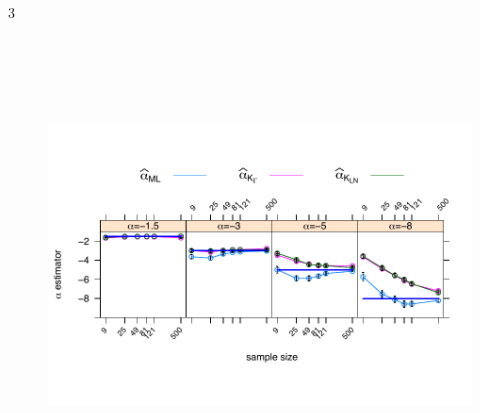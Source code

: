 \documentclass[a0,portrait]{a0poster}
\begin{document}
\begin{parcolumns}[colwidths={1=.3\textwidth,2=.39\textwidth},rulebetweencolor=blue
	,rulebetween=true]{3}
{\begin{minipage}[t]{1\linewidth}
\begin{center}
 \begin{minipage}[t]{0.90\linewidth}
  	\begin{figure}
	\includegraphics[width=20cm, height=12cm]{../../../../Figures/IVJIAAIS2017/SinCont/alfa500_sinmenos20_NoContMVyGAyLN_OPTIM_hasta500_MOM1_2_SinCte_Ver2_FINALbarrasdeerror_L3.pdf}\\
	\end{figure}
\end{minipage}


\end{center}
\end{minipage}}
\end{parcolumns}
\end{document}
